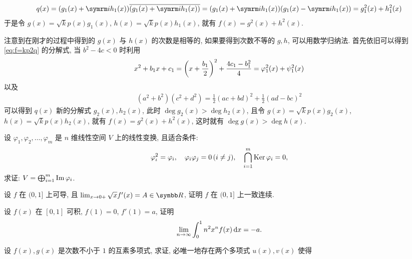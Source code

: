 \begin{exercise}[series=exer]
\begin{answer}
\begin{answersheet}
\begin{align*}
                q(x) = (g_{1}(x) + \mi h_{1}(x))\overline{(g_{1}(x) + \mi h_{1}(x))} = (g_{1}(x) + \mi h_{1}(x))(g_{1}(x) - \mi h_{1}(x)) = g_{1}^{2}(x) + h_{1}^{2}(x)
            \end{align*}
            于是令 $ g(x) = \sqrt{k}p(x)g_{1}(x) $, $ h(x) = \sqrt{k}p(x)h_{1}(x) $, 就有 $ f(x) = g^{2}(x) + h^{2}(x) $. 
            \item 注意到在刚才的过程中得到的 $ g(x) $ 与 $ h(x) $ 的次数是相等的, 如果要得到次数不等的 $ g, h $, 可以用数学归纳法. 首先依旧可以得到 \eqref{eq:f=kp2q} 的分解式, 当 $ b^{2} - 4c < 0 $ 时利用
            \begin{align*}
                x^{2} + b_{1}x + c_{1} = \qty(x + \frac{b_{1}}{2})^{2} + \frac{4c_{1} - b_{1}^{2}}{4} = \varphi_{1}^{2}(x) + \psi_{1}^{2}(x)
            \end{align*}
            以及
            \begin{align*}
                (a^{2} + b^{2})(c^{2} + d^{2}) = \frac{1}{2}(ac + bd)^{2} + \frac{1}{2}(ad - bc)^{2}
            \end{align*}
            可以得到 $ q(x) $ 新的分解式 $ g_{2}(x), h_{2}(x) $, 此时 $ \deg g_{2}(x) > \deg h_{2}(x) $, 且令 $ g(x) = \sqrt{k}p(x)g_{2}(x) $, $ h(x) = \sqrt{k}p(x)h_{2}(x) $, 就有 $ f(x) = g^{2}(x) + h^{2}(x) $, 这时就有 $ \deg g(x) > \deg h(x) $. 
        \end{answersheet}
    \end{answer}
    \item 设 $ \varphi_{1}, \varphi_{2}, \dots, \varphi_{m} $ 是 $ n $ 维线性空间 $ V $ 上的线性变换, 且适合条件:
    \begin{align*}
        \varphi_{i}^{2} = \varphi_{i}, \quad \varphi_{i}\varphi_{j} = 0\,(i\ne j), \quad \bigcap_{i=1}^{m}\operatorname{Ker}\varphi_{i} = 0,
    \end{align*}
    求证: $ V = \bigoplus_{i=1}^{m}\operatorname{Im}\varphi_{i} $. 
    \item 设 $ f $ 在 $ (0, 1] $ 上可导, 且 $ \limit{x}{0+} \sqrt{x} f'(x) = A \in \R $, 证明 $ f $ 在 $ (0, 1] $ 上一致连续. 
    \item 设 $ f(x) $ 在 $ [0, 1] $ 可积, $ f(1) = 0 $, $ f'(1) = a $, 证明
    \begin{align*}
        \lim_{n \to \infty}\int_{0}^{1}n^{2}x^{n}f(x)\dd{x} = -a.
    \end{align*}
    \item 设 $ f(x), g(x) $ 是次数不小于 $ 1 $ 的互素多项式, 求证, 必唯一地存在两个多项式 $ u(x), v(x) $ 使得
    \begin{align*}

\end{align*}
\end{exercise}
